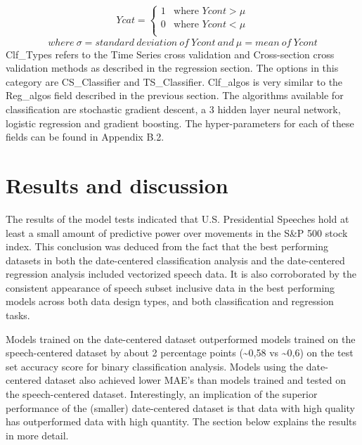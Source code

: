 \documentclass[11pt,preprint, authoryear]{elsarticle}
\numberwithin{equation}{section}
\numberwithin{figure}{section}
\numberwithin{table}{section}
\begin{document}
\begin{align}
Ycat=   \left\{ 
\begin{array}{ll} 
      1  &\text{where } Ycont>\mu \label{eq2} \\
      0  &\text{where } Ycont<\mu \\
\end{array} 
\right. 
\end{align} \[
where \ \sigma = standard \ deviation \ of \ Ycont \ and \ \mu = mean \ of \ Ycont
\] Clf\_Types refers to the Time Series cross validation and
Cross-section cross validation methods as described in the regression
section. The options in this category are CS\_Classifier and
TS\_Classifier. Clf\_algos is very similar to the Reg\_algos field
described in the previous section. The algorithms available for
classification are stochastic gradient descent, a 3 hidden layer neural
network, logistic regression and gradient boosting. The hyper-parameters
for each of these fields can be found in Appendix B.2.

\hypertarget{results-and-discussion}{%
\section{\texorpdfstring{Results and discussion
\label{results}}{Results and discussion }}\label{results-and-discussion}}

The results of the model tests indicated that U.S. Presidential Speeches
hold at least a small amount of predictive power over movements in the
S\&P 500 stock index. This conclusion was deduced from the fact that the
best performing datasets in both the date-centered classification
analysis and the date-centered regression analysis included vectorized
speech data. It is also corroborated by the consistent appearance of
speech subset inclusive data in the best performing models across both
data design types, and both classification and regression tasks.

Models trained on the date-centered dataset outperformed models trained
on the speech-centered dataset by about 2 percentage points
(\textasciitilde0,58 vs \textasciitilde0,6) on the test set accuracy
score for binary classification analysis. Models using the date-centered
dataset also achieved lower MAE's than models trained and tested on the
speech-centered dataset. Interestingly, an implication of the superior
performance of the (smaller) date-centered dataset is that data with
high quality has outperformed data with high quantity. The section below
explains the results in more detail.
\end{document}

